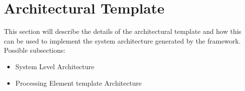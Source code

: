 \section{Architectural Template}
This section will describe the details of the architectural template and how this can be used to implement the system architecture generated by the framework.
\\
Possible subsections:
\begin{itemize}
	\item System Level Architecture
	\item Processing Element template Architecture
\end{itemize}
